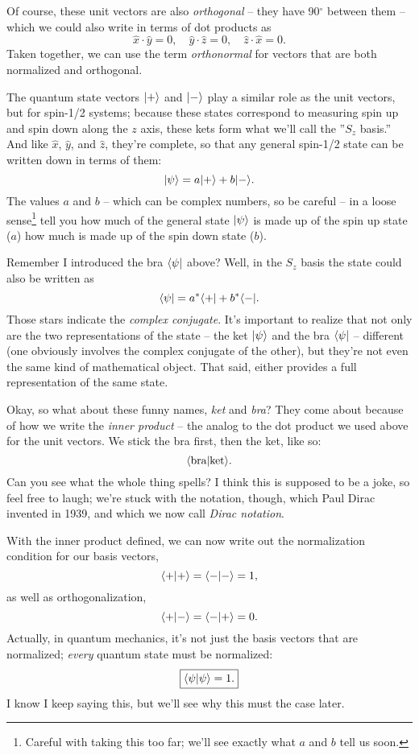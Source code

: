 Of course, these unit vectors are also \emph{orthogonal} -- they have 90$^\circ$ between them -- which we could also write in terms of dot products as
\[
\hat{x} \cdot \hat{y} = 0, \quad \hat{y} \cdot \hat{z} = 0, \quad \hat{z} \cdot \hat{x} = 0.
\]
Taken together, we can use the term \emph{orthonormal} for vectors that are both normalized and orthogonal.

The quantum state vectors $| + \rangle$ and $| - \rangle$ play a similar role as the unit vectors, but for spin-1/2 systems; because these states correspond to measuring spin up and spin down along the $z$ axis, these kets form what we'll call the ''$S_z$ basis.''  And like $\hat{x}$, $\hat{y}$, and $\hat{z}$, they're complete, so that any general spin-1/2 state can be written down in terms of them:
\begin{equation}
| \psi \rangle = a | + \rangle + b| - \rangle.
\end{equation}
The values $a$ and $b$ -- which can be complex numbers, so be careful -- in a loose sense\footnote{Careful with taking this too far; we'll see exactly what $a$ and $b$ tell us soon.} tell you how much of the general state $| \psi \rangle$ is made up of the spin up state ($a$) how much is made up of the spin down state ($b$).

Remember I introduced the bra $\langle \psi |$ above?  Well, in the $S_z$ basis the state could also be written as
\begin{equation}
\langle \psi | = a^* \langle + | + b^* \langle - |.
\end{equation}
Those stars indicate the \emph{complex conjugate}.  It's important to realize that not only are the two representations of the state -- the ket $| \psi \rangle$ and the bra $\langle \psi |$ -- different (one obviously involves the complex conjugate of the other), but they're not even the same kind of mathematical object.  That said, either provides a full representation of the same state.

Okay, so what about these funny names, \emph{ket} and \emph{bra}?  They come about because of how we write the \emph{inner product} -- the analog to the dot product we used above for the unit vectors.  We stick the bra first, then the ket, like so:
\[
\langle \text{bra} | \text{ket} \rangle.
\]
Can you see what the whole thing spells?  I think this is supposed to be a joke, so feel free to laugh; we're stuck with the notation, though, which Paul Dirac invented in 1939, and which we now call \emph{Dirac notation}. 

With the inner product defined, we can now write out the normalization condition for our basis vectors,
\begin{equation}
\langle + | + \rangle = \langle - | - \rangle = 1,
\end{equation}
as well as orthogonalization,
\begin{equation}
\langle + | - \rangle = \langle - | + \rangle = 0.
\end{equation}
Actually, in quantum mechanics, it's not just the basis vectors that are normalized; \emph{every} quantum state must be normalized:
\begin{equation}
\boxed{
\langle \psi | \psi \rangle = 1.
}\end{equation}
I know I keep saying this, but we'll see why this must the case later.

